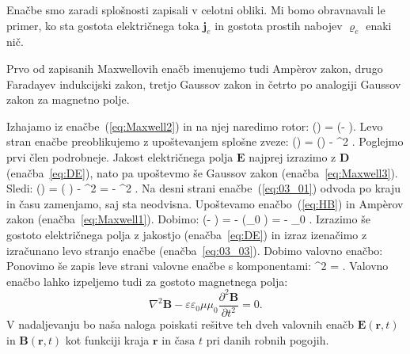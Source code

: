 Enačbe smo zaradi splošnosti zapisali v celotni obliki. Mi bomo 
obravnavali le primer, ko sta gostota električnega toka $\mathbf{j}_e$ in 
gostota prostih nabojev $\varrho_e$ enaki nič.  

\begin{remark}
Prvo od zapisanih Maxwellovih enačb imenujemo tudi Amp\`{e}rov zakon,
drugo Faradayev indukcijski zakon,
tretjo Gaussov zakon in četrto po analogiji Gaussov zakon za magnetno polje.
\end{remark}

Izhajamo iz enačbe~(\ref{eq:Maxwell2}) in na njej naredimo rotor:
\beq
\nabla \times \left(\nabla\times{}\right) =
\nabla \times \left(- \right)\!\!.
\label{eq:03_01}
\eeq
Levo stran enačbe preoblikujemo z upoštevanjem splošne zveze:
\beq
\nabla \times (\nabla \times {}) = \nabla (\nabla \cdot {}) - \nabla^2 .
\label{eq:03_02}
\eeq
Poglejmo prvi člen podrobneje. Jakost električnega polja $\mathbf{E}$ najprej  
izrazimo z $\mathbf{D}$ (enačba~\ref{eq:DE}), nato pa upoštevmo še Gaussov zakon 
(enačba~\ref{eq:Maxwell3}). Sledi:
\beq
\nabla \times (\nabla \times {}) = \nabla \left(\nabla \cdot 
{}\right) - \nabla^2  = - \nabla^2 .
\label{eq:03_03}
\eeq
Na desni strani enačbe~(\ref{eq:03_01}) odvoda po kraju in času zamenjamo, 
saj sta neodvisna. Upoštevamo enačbo~(\ref{eq:HB}) in Amp\`{e}rov zakon (enačba~\ref{eq:Maxwell1}). Dobimo:
\beq
\nabla \times \left(- \right) = 
- \left(\mu \mu_0 \nabla
\times {}\right) = - \mu \mu_0 .
\label{eq:03_04}
\eeq
Izrazimo še gostoto električnega polja z jakostjo (enačba~\ref{eq:DE}) in izraz izenačimo z 
izračunano levo stranjo enačbe (enačba~\ref{eq:03_03}). Dobimo valovno enačbo:
Ponovimo še zapis leve strani valovne enačbe s komponentami:
\beq
\nabla^2  =  
\!\!.
\label{eq:03_05}
\eeq
Valovno enačbo lahko izpeljemo tudi za gostoto magnetnega polja:
\begin{equation}
\nabla^2\mathbf{B} - \varepsilon \varepsilon_0 \mu \mu_0 \frac{\partial^2 \mathbf{B}}{\partial t^2} = 0.
\label{eq:valovnaB}
\end{equation}
V nadaljevanju bo naša naloga poiskati rešitve teh dveh valovnih enačb $\mathbf{E}(\mathbf{r},t)$
in $\mathbf{B}(\mathbf{r},t)$ kot funkciji kraja $\mathbf{r}$ in časa $t$ pri danih robnih pogojih.

